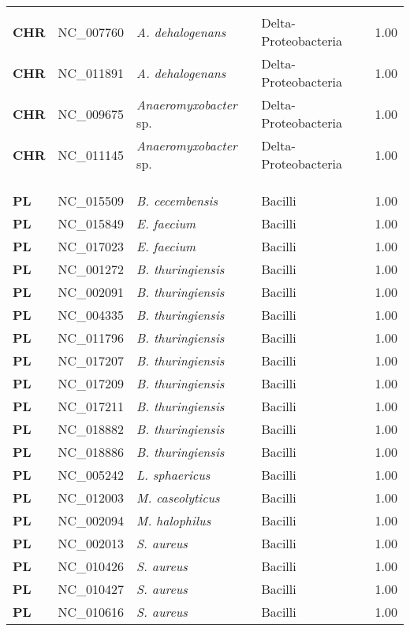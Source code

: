 \begin{adjustwidth}{-3cm}{2cm}
{\begin{supertabular}{>{\bfseries}l|p{0.1\textwidth}p{0.14\textwidth}l|l}
\hline\\
CHR & NC\_007760 & \textit{A. dehalogenans} & Delta-Proteobacteria & 1.00\\
CHR & NC\_011891 & \textit{A. dehalogenans} & Delta-Proteobacteria & 1.00\\
CHR & NC\_009675 & \textit{Anaeromyxobacter} sp. & Delta-Proteobacteria & 1.00\\
CHR & NC\_011145 & \textit{Anaeromyxobacter} sp. & Delta-Proteobacteria & 1.00\\
\\
\\
\hline\\
PL & NC\_015509 & \textit{B. cecembensis} & Bacilli & 1.00\\
PL & NC\_015849 & \textit{E. faecium} & Bacilli & 1.00\\
PL & NC\_017023 & \textit{E. faecium} & Bacilli & 1.00\\
PL & NC\_001272 & \textit{B. thuringiensis} & Bacilli & 1.00\\
PL & NC\_002091 & \textit{B. thuringiensis} & Bacilli & 1.00\\
PL & NC\_004335 & \textit{B. thuringiensis} & Bacilli & 1.00\\
PL & NC\_011796 & \textit{B. thuringiensis} & Bacilli & 1.00\\
PL & NC\_017207 & \textit{B. thuringiensis} & Bacilli & 1.00\\
PL & NC\_017209 & \textit{B. thuringiensis} & Bacilli & 1.00\\
PL & NC\_017211 & \textit{B. thuringiensis} & Bacilli & 1.00\\
PL & NC\_018882 & \textit{B. thuringiensis} & Bacilli & 1.00\\
PL & NC\_018886 & \textit{B. thuringiensis} & Bacilli & 1.00\\
PL & NC\_005242 & \textit{L. sphaericus} & Bacilli & 1.00\\
PL & NC\_012003 & \textit{M. caseolyticus} & Bacilli & 1.00\\
PL & NC\_002094 & \textit{M. halophilus} & Bacilli & 1.00\\
PL & NC\_002013 & \textit{S. aureus} & Bacilli & 1.00\\
PL & NC\_010426 & \textit{S. aureus} & Bacilli & 1.00\\
PL & NC\_010427 & \textit{S. aureus} & Bacilli & 1.00\\
PL & NC\_010616 & \textit{S. aureus} & Bacilli & 1.00\\

\end{supertabular}}
\end{adjustwidth}
